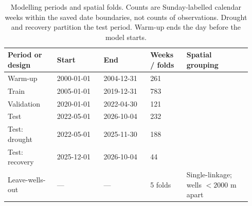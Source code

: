 \begin{table}[p]
\centering
\small
\setlength{\tabcolsep}{2pt}
\caption{Modelling periods and spatial folds. Counts are Sunday-labelled calendar weeks within the saved date boundaries, not counts of observations. Drought and recovery partition the test period. Warm-up ends the day before the model starts.}
\label{tab:periods}
\begin{tabular}{@{}p{0.19\linewidth}p{0.18\linewidth}p{0.18\linewidth}p{0.14\linewidth}p{0.25\linewidth}@{}}
\toprule
Period or design & Start & End & Weeks / folds & Spatial grouping \\
\midrule
Warm-up & 2000-01-01 & 2004-12-31 & \num{261} &  \\
Train & 2005-01-01 & 2019-12-31 & \num{783} &  \\
Validation & 2020-01-01 & 2022-04-30 & \num{121} &  \\
Test & 2022-05-01 & 2026-10-04 & \num{232} &  \\
Test: drought & 2022-05-01 & 2025-11-30 & \num{188} &  \\
Test: recovery & 2025-12-01 & 2026-10-04 & \num{44} &  \\
\midrule
Leave-wells-out & — & — & \num{5} folds & Single-linkage; wells $< \num{2000}$ m apart \\
\bottomrule
\end{tabular}
\end{table}
